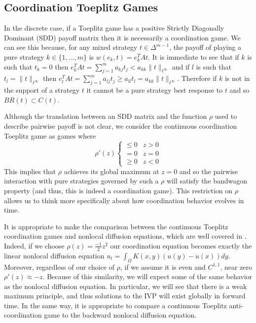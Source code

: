 \documentclass[aps,
preprint,
groupedaddress,
showkeys,
amsmath]{revtex4-2}
\begin{document}
\subsection{Coordination Toeplitz Games}\label{SUBSEC:CoordinationToeplitzGames}
In the discrete case, if a Toeplitz game has a positive Strictly Diagonally Dominant (SDD) payoff matrix then it is necessarily a coordination game. We can see this because, for any mixed strategy $t\in \Delta^{m-1}$, the payoff of playing a pure strategy $k\in \{1,...,m\}$ is $w(e_k,t)=e_k^TAt$. It is immediate to see that if $k$ is such that $t_k=0$ then ${e_k^{T}At}=\sum_{j=1}^ma_{kj}t_j<a_{kk}\|t\|_{\ell^\infty}$ and if $l$ is such that $t_l=\|t\|_{\ell^\infty}$ then ${e_l^{T}At}=\sum_{j=1}^ma_{lj}t_j\geq a_{ll}t_l=a_{kk}\|t\|_{\ell^\infty}$. Therefore if $k$ is not in the support of a strategy $t$ it cannot be a pure strategy best response to $t$ and so $BR(t)\subset C(t)$. 

Although the translation between an SDD matrix and the function $\rho$ used to describe pairwise payoff is not clear, we consider the continuous coordination Toeplitz game as games where
\begin{equation}\label{coordinationcondition}
\rho'(z)\begin{cases}\leq0&z>0\\
=0&z=0\\
\geq 0 & z<0\end{cases}
\end{equation} 
This implies that $\rho$ achieves its global maximum at $z=0$ and so the pairwise interaction with pure strategies governed by such a $\rho$ will satisfy the bandwagon property (and thus, this is indeed a coordination game). This restriction on $\rho$ allows us to think more specifically about how coordination behavior evolves in time. 

It is appropriate to make the comparison between the continuous Toeplitz coordination games and nonlocal diffusion equations, which are well covered in \cite{NonlocalDiffusionProblems}. Indeed, if we choose $\rho(z)=\frac{-1}{2}z^2$ our coordination equation becomes exactly the linear nonlocal diffusion equation $u_t=\int_\Omega K(x,y)(u(y)-u(x))dy$. Moreover, regardless of our choice of $\rho$, if we assume it is even and $C^{1,1}$, near zero $\rho'(z)\approx-z.$ Because of this similarity, we will expect some of the same behavior as the nonlocal diffusion equation. In particular, we will see that there is a weak maximum principle, and thus solutions to the IVP will exist globally in forward time. In the same way, it is appropriate to compare a continuous Toeplitz anti-coordination game to the backward nonlocal diffusion equation.
\end{document}

